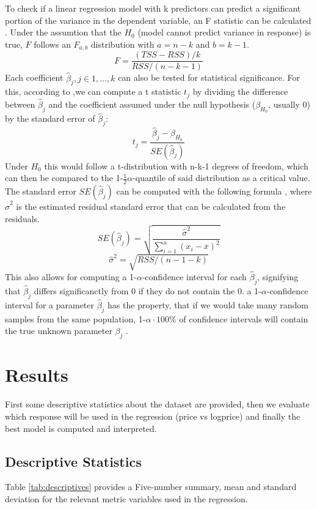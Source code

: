 \documentclass[12 pt]{scrartcl}
\begin{document}
To check if a linear regression model with k predictors can predict a significant portion of the variance in the dependent variable, an F statistic can be calculated \citep[p.~76]{james2013introduction}. Under the assumtion that the $H_0$ (model cannot predict variance in response) is true, $F$ follows an $F_{a,b}$ distribution with $a = n-k$ and $b = k-1$.
\[F = \frac{(TSS-RSS)/k}{RSS/(n-k-1)}\]
Each coefficient $\hat{\beta}_j, j \in {1,...,k}$ can also be tested for statistical significance. For this, according to \citet[p.~67]{james2013introduction},we can compute a t statistic $t_j$ by dividing the difference between $\hat{\beta}_j$ and the coefficient assumed under the null hypothesis ($\beta_{H_0}$, usually 0) by the standard error of $\hat{\beta}_j$:
\[ t_j = \frac{\hat{\beta}_j - \beta_{H_0}}{SE(\hat{\beta}_j)} \]
Under $H_0$ this would follow a t-distribution with n-k-1 degrees of freedom, which can then be compared to the 1-$\frac{1}{2}\alpha$-quantile of said distribution as a critical value.
The standard error $SE(\hat{\beta}_j)$ can be computed with the following formula \citep[p.~66]{james2013introduction}, where $\hat{\sigma}^2$ is the estimated residual standard error that can be calculated from the residuals.
\[SE(\hat{\beta}_j) = \sqrt{\frac{\hat{\sigma}^2}{\sum_{i=1}^n{(x_i-\overline{x})^2}}}\]
\[ \hat{\sigma}^2 = \sqrt{RSS/(n-1-k)}  \]
This also allows for computing a 1-$\alpha$-confidence interval for each $\hat{\beta}_j$, signifying that $\hat{\beta}_j$ differs significanctly from 0 if they do not contain the 0. a 1-$\alpha$-confidence interval for a parameter $\hat{\beta}_j$ has the property, that if we would take many random samples from the same population, 1-$\alpha\cdot100\%$ of confidence intervals will contain the true unknown parameter $\beta_j$ \citep[p.~66]{james2013introduction}.

\section{Results}

First some descriptive statistics about the dataset are provided, then we evaluate which response will be used in the regression (price vs logprice) and finally the best model is computed and interpreted.

\subsection{Descriptive Statistics}

Table \ref{tab:descriptives} provides a Five-number summary, mean and standard deviation for the relevant metric variables used in the regression.
\end{document}
